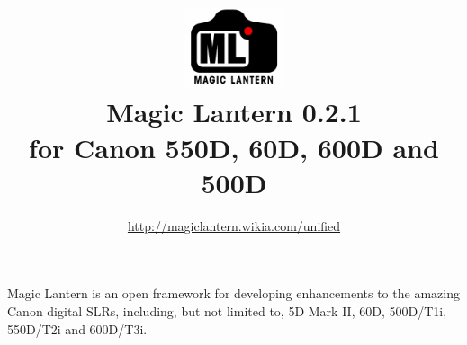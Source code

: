 \documentclass[a4paper,english]{article}
\renewcommand{\href}[2]{\directlua{ShowLink("#1", "#2")}}
\begin{document}
\title{\vspace{-1cm}\includegraphics[width=3cm]{Logo.png}\\Magic Lantern 0.2.1\\{\small for Canon 550D, 60D, 600D and 500D}}
\author{\url{http://magiclantern.wikia.com/unified}}
\maketitle



Magic Lantern is an open framework for developing enhancements to the amazing Canon digital SLRs, including, but not limited to,
5D Mark II, 60D, 500D/T1i, 550D/T2i and 600D/T3i.
\end{document}

